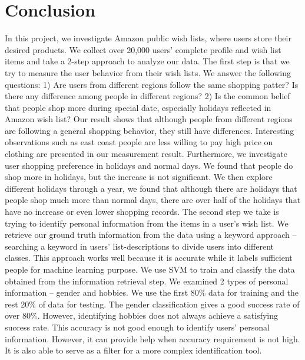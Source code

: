 \documentclass{llncs}
\begin{document}
\section{Conclusion}
In this project, we investigate Amazon public wish lists, where users store their desired products. We collect over 20,000 users' complete profile and wish list items and take a 2-step approach to analyze our data. The first step is that we try to measure the user behavior from their wish lists. We answer the following questions: 1) Are users from different regions follow the same shopping patter? Is there any difference among people in different regions? 2) Is the common belief that people shop more during special date, especially holidays reflected in Amazon wish list? Our result shows that although people from different regions are following a general shopping behavior, they still have differences. Interesting observations such as east coast people are less willing to pay high price on clothing are presented in our measurement result. Furthermore, we investigate user shopping preference in holidays and normal days. We found that people do shop more in holidays, but the increase is not significant. We then explore different holidays through a year, we found that although there are holidays that people shop much more than normal days, there are over half of the holidays that have no increase or even lower shopping records.  The second step we take is trying to identify personal information from the items in a user's wish list. We retrieve our ground truth information from the data using a keyword approach -- searching a keyword in users' list-descriptions to divide users into different classes. This approach works well because it is accurate while it labels sufficient people for machine learning purpose. We use SVM to train and classify the data obtained from the information retrieval step. We examined 2 types of personal information -- gender and hobbies. We use the first 80\% data for training and the rest 20\% of data for testing. The gender classification gives a good success rate of over 80\%. However, identifying hobbies does not always achieve a satisfying success rate. This accuracy is not good enough to identify users' personal information. However, it can provide help when accuracy requirement is not high. It is also able to serve as a filter for a more complex identification tool.


%
%



\end{document}
